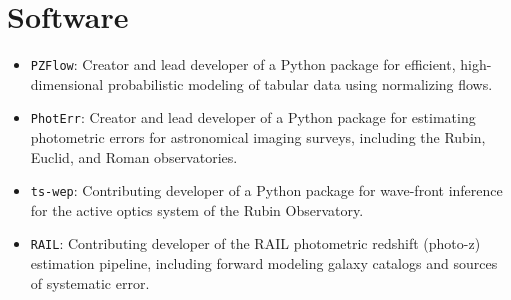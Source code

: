\section{Software}
\begin{itemize}[leftmargin=2em, itemindent=-2em]
    \item \texttt{PZFlow}: 
        Creator and lead developer of a Python package for efficient, high-dimensional probabilistic modeling of tabular data using normalizing flows.
        \href{https://github.com/jfcrenshaw/pzflow}{\faGithub}
        \href{https://pypi.org/project/pzflow/}{\faCloudDownload}
    
    \item \texttt{PhotErr}: 
        Creator and lead developer of a Python package for estimating photometric errors for astronomical imaging surveys, including the Rubin, Euclid, and Roman observatories.
        \href{https://github.com/jfcrenshaw/photerr}{\faGithub}
        \href{https://pypi.org/project/photerr/}{\faCloudDownload}

    \item \texttt{ts-wep}: 
        Contributing developer of a Python package for wave-front inference for the active optics system of the Rubin Observatory.
        \href{https://github.com/lsst-ts/ts_wep}{\faGithub}

    \item \texttt{RAIL}:
        Contributing developer of the RAIL photometric redshift (photo-z) estimation pipeline, including forward modeling galaxy catalogs and sources of systematic error.
        \href{https://github.com/LSSTDESC/RAIL}{\faGithub}
        \href{https://pypi.org/project/pz-rail/}{\faCloudDownload}
\end{itemize}